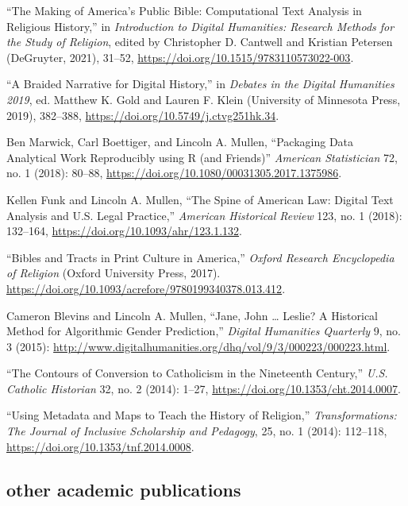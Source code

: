 \documentclass[11pt]{article}
\begin{document}
``The Making of America's Public Bible: Computational Text Analysis in Religious History,'' in \emph{Introduction to Digital Humanities: Research Methods for the Study of Religion}, edited by Christopher D. Cantwell and 
Kristian Petersen (DeGruyter, 2021), 31--52, \url{https://doi.org/10.1515/9783110573022-003}.

``A Braided Narrative for Digital History,'' in \emph{Debates in the Digital Humanities 2019}, ed. Matthew K. Gold and Lauren F. Klein (University of Minnesota Press, 2019), 382--388, \url{ https://doi.org/10.5749/j.ctvg251hk.34}.

Ben Marwick, Carl Boettiger, and Lincoln A. Mullen, ``Packaging Data Analytical Work Reproducibly using R (and Friends)'' \emph{American Statistician} 72, no. 1 (2018): 80--88, \url{https://doi.org/10.1080/00031305.2017.1375986}.

Kellen Funk and Lincoln A. Mullen, ``The Spine of American Law: Digital Text Analysis and U.S. Legal Practice,'' \emph{American Historical Review} 123, no.  1 (2018): 132--164, \url{https://doi.org/10.1093/ahr/123.1.132}.

``Bibles and Tracts in Print Culture in America,'' \emph{Oxford Research Encyclopedia of Religion} (Oxford University Press, 2017). \url{ https://doi.org/10.1093/acrefore/9780199340378.013.412}.

Cameron Blevins and Lincoln A. Mullen, ``Jane, John \ldots{} Leslie? A Historical Method for Algorithmic Gender Prediction,'' \emph{Digital Humanities Quarterly} 9, no. 3 (2015): \url{http://www.digitalhumanities.org/dhq/vol/9/3/000223/000223.html}. 

``The Contours of Conversion to Catholicism in the Nineteenth Century,'' \emph{U.S. Catholic Historian} 32, no. 2 (2014): 1--27, \url{https://doi.org/10.1353/cht.2014.0007}. 

``Using Metadata and Maps to Teach the History of Religion,'' \emph{Transformations: The Journal of Inclusive Scholarship and Pedagogy}, 25, no. 1 (2014): 112--118, \url{https://doi.org/10.1353/tnf.2014.0008}.


\subsection{other academic publications}\label{other-academic}
\end{document}
